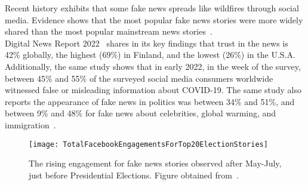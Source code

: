Recent history exhibits that some fake news spreads like wildfires through social media. Evidence shows that the most popular fake news stories were more widely shared than the most popular mainstream news stories~\parencite{Buzzfeed_FakeNewsOutperformRealNews_Silverman}.\\
Digital News Report 2022~\parencite{ReutersInstituteDigitalNewsReport} shares in its key findings that trust in the news is 42\% globally, the highest (69\%) in Finland, and the lowest (26\%) in the U.S.A. Additionally, the same study shows that in early 2022, in the week of the survey, between 45\% and 55\% of the surveyed social media consumers worldwide witnessed false or misleading information about COVID-19. The same study also reports the appearance of fake news in politics was between 34\% and 51\%, and between 9\% and 48\% for fake news about celebrities, global warming, and immigration~\parencite{StatistaUsageOfSocialMedia_Watson}.
\begin{figure}
    \centering
    \texttt{[image: TotalFacebookEngagementsForTop20ElectionStories]}
    \caption[Total Facebook Engagements for Top 20 Election Stories.]{The rising engagement for fake news stories observed after May-July, just before Presidential Elections. Figure obtained from~\parencite{Buzzfeed_FakeNewsOutperformRealNews_Silverman}.}\label{fig:TotalFacebookEngagementsForTop20ElectionStories}
\end{figure}

